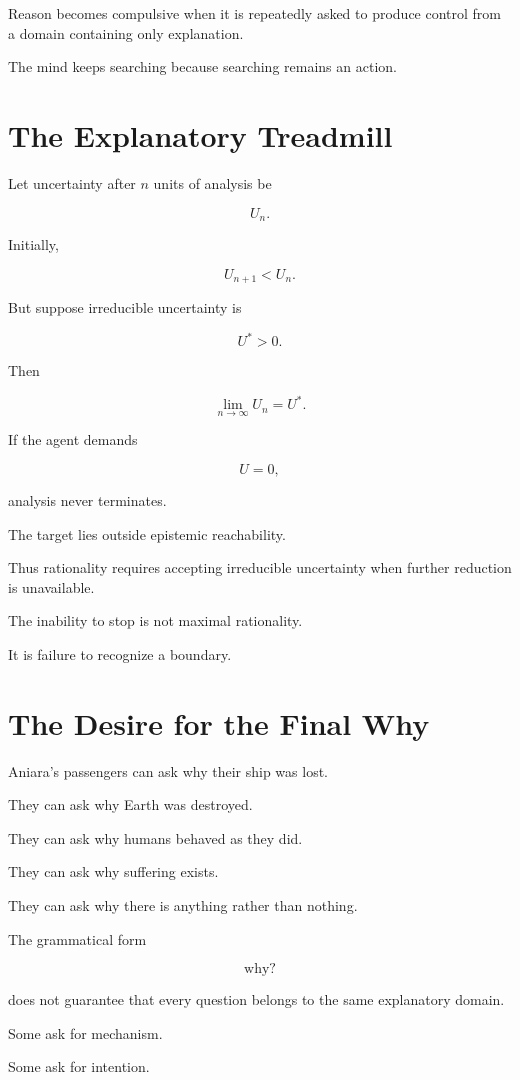 \documentclass[11pt,oneside]{book}
\theoremstyle{definition}
\theoremstyle{remark}
\begin{document}
Reason becomes compulsive when it is repeatedly asked to produce control from a domain containing only explanation.

The mind keeps searching because searching remains an action.

\section{The Explanatory Treadmill}

Let uncertainty after \(n\) units of analysis be

\[
U_n.
\]

Initially,

\[
U_{n+1}<U_n.
\]

But suppose irreducible uncertainty is

\[
U^\ast>0.
\]

Then

\[
\lim_{n\rightarrow\infty}U_n
=
U^\ast.
\]

If the agent demands

\[
U=0,
\]

analysis never terminates.

The target lies outside epistemic reachability.

Thus rationality requires accepting irreducible uncertainty when further reduction is unavailable.

The inability to stop is not maximal rationality.

It is failure to recognize a boundary.

\section{The Desire for the Final Why}

Aniara's passengers can ask why their ship was lost.

They can ask why Earth was destroyed.

They can ask why humans behaved as they did.

They can ask why suffering exists.

They can ask why there is anything rather than nothing.

The grammatical form

\[
\text{why?}
\]

does not guarantee that every question belongs to the same explanatory domain.

Some ask for mechanism.

Some ask for intention.
\end{document}
